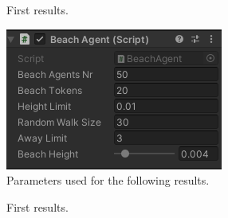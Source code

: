 \documentclass[12pt]{article}
\begin{document}
    \begin{figure}[H]
        \centering     %
        \caption{First results.}
        \label{fig:beachNotFlat}
    \end{figure}

    \begin{figure}[H]
        \centering
        \includegraphics[scale = 0.8]{images/Beach agent/Parameters 2}
        \caption{Parameters used for the following results.}
    \end{figure}

    \begin{figure}[H]
        \centering     %
        \caption{First results.}
        \label{fig:beachFlat}
    \end{figure}
\end{document}
